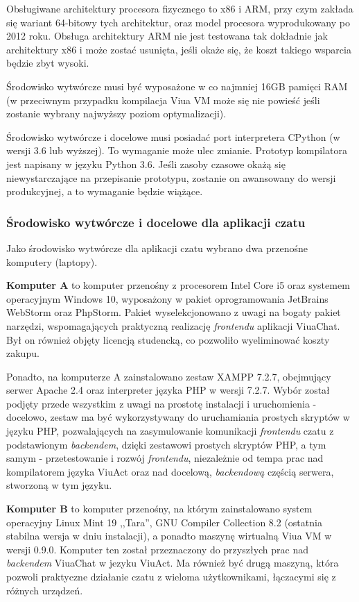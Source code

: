 \documentclass[11pt,oneside,a4paper,titlepage,onecolumn]{article}
\begin{document}
Obsługiwane architektury procesora fizycznego to x86 i ARM, przy czym zakłada się wariant 64-bitowy tych
architektur, oraz model procesora wyprodukowany po 2012 roku. Obsługa architektury ARM nie jest testowana tak
dokładnie jak architektury x86 i może zostać usunięta, jeśli okaże się, że koszt takiego wsparcia będzie zbyt
wysoki.

Środowisko wytwórcze musi być wyposażone w co najmniej 16GB pamięci RAM (w przeciwnym przypadku kompilacja
Viua VM może się nie powieść jeśli zostanie wybrany najwyższy poziom optymalizacji).

Środowisko wytwórcze i docelowe musi posiadać port interpretera CPython (w wersji 3.6 lub wyższej). To
wymaganie może ulec zmianie. Prototyp kompilatora jest napisany w języku Python 3.6. Jeśli zasoby czasowe
okażą się niewystarczające na przepisanie prototypu, zostanie on awansowany do wersji produkcyjnej, a to
wymaganie będzie wiążące.

\subsubsection{Środowisko wytwórcze i docelowe dla aplikacji czatu}

Jako środowisko wytwórcze dla aplikacji czatu wybrano dwa przenośne komputery (laptopy).

\textbf{Komputer A} to komputer przenośny z procesorem Intel Core i5 oraz systemem operacyjnym Windows 10,
wyposażony w pakiet oprogramowania JetBrains WebStorm oraz PhpStorm. Pakiet wyselekcjonowano z uwagi
na bogaty pakiet narzędzi, wspomagających praktyczną realizację \textit{frontendu} aplikacji ViuaChat.
Był on również objęty licencją studencką, co pozwoliło wyeliminować koszty zakupu.

Ponadto, na komputerze A zainstalowano zestaw XAMPP 7.2.7, obejmujący serwer Apache 2.4 oraz interpreter 
języka PHP w wersji 7.2.7. Wybór został podjęty przede wszystkim z uwagi na prostotę instalacji i
uruchomienia - docelowo, zestaw ma być wykorzystywany do uruchamiania prostych skryptów w języku
PHP, pozwalających na zasymulowanie komunikacji \textit{frontendu} czatu z podstawionym \textit{backendem},
dzięki zestawowi prostych skryptów PHP, a tym samym - przetestowanie i rozwój \textit{frontendu}, 
niezależnie od tempa prac nad kompilatorem języka ViuAct oraz nad docelową, \textit{backendową} częścią 
serwera, stworzoną w tym języku.

\textbf{Komputer B} to komputer przenośny, na którym zainstalowano system operacyjny Linux Mint 19 
,,Tara'', GNU Compiler Collection 8.2 (ostatnia stabilna wersja w dniu instalacji), a ponadto maszynę
wirtualną Viua VM w wersji 0.9.0. Komputer ten został przeznaczony do przyszłych prac nad 
\textit{backendem} ViuaChat w jezyku ViuAct. Ma również być drugą maszyną, która pozwoli praktyczne
działanie czatu z wieloma użytkownikami, łączacymi się z różnych urządzeń.
\end{document}
